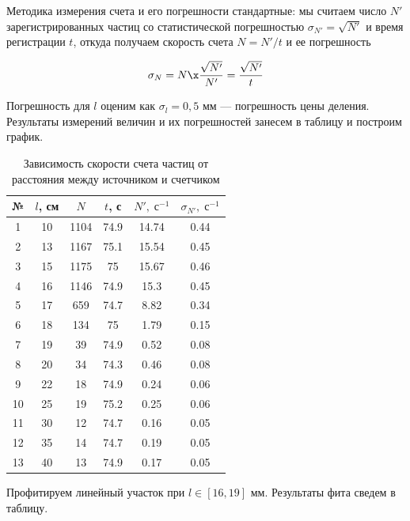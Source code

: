 \documentclass[12pt]{kiarticle} %
\begin{document}
		Методика измерения счета и его погрешности стандартные: мы считаем число $ N' $ зарегистрированных частиц со статистической погрешностью $ \sigma_{N'}  = \sqrt{N'} $ и время регистрации $ t $, откуда получаем скорость счета $ N = N'/t $ и ее погрешность 
		
		 \begin{equation}\label{}
		\sigma_{N} = N \x \dfrac{\sqrt{N'}}{N'} = \dfrac{\sqrt{N'}}{t}
		\end{equation}
	
		Погрешность для $ l $ оценим как $ \sigma_l = 0,5 $ мм --- погрешность цены деления. Результаты измерений величин и их погрешностей занесем в таблицу и построим график.
		
			\begin{table}[H]
			\caption{Зависимость скорости счета частиц от расстояния между источником и счетчиком}
			\begin{center}
				\begin{tabular}{|c|c|c|c|c|c|}
					\hline 
					№ & $ l $, см & $ N $ & $ t $, с & $ N', \; с^{-1} $ & $ \sigma_{N'}, \; с^{-1} $  \\ 
					\hline 
				1 & 10 & 1104 & 74.9 & 14.74 & 0.44 \\
				2 & 13 & 1167 & 75.1 & 15.54 & 0.45 \\
				3 & 15 & 1175 & 75 & 15.67 & 0.46 \\
				4 & 16 & 1146 & 74.9 & 15.3 & 0.45 \\
				5 & 17 & 659 & 74.7 & 8.82 & 0.34 \\
				6 & 18 & 134 & 75 & 1.79 & 0.15 \\
				7 & 19 & 39 & 74.9 & 0.52 & 0.08 \\
				8 & 20 & 34 & 74.3 & 0.46 & 0.08 \\
				9 & 22 & 18 & 74.9 & 0.24 & 0.06 \\
				10 & 25 & 19 & 75.2 & 0.25 & 0.06 \\
				11 & 30 & 12 & 74.7 & 0.16 & 0.05 \\
				12 & 35 & 14 & 74.7 & 0.19 & 0.05 \\
				13 & 40 & 13 & 74.9 & 0.17 & 0.05 \\
					\hline 
				\end{tabular} 
			\end{center}
			\label{table g}
		\end{table}
	
	Профитируем линейный участок при $ l \in [16,19] $ мм. Результаты фита сведем в таблицу.
		
\end{document}

